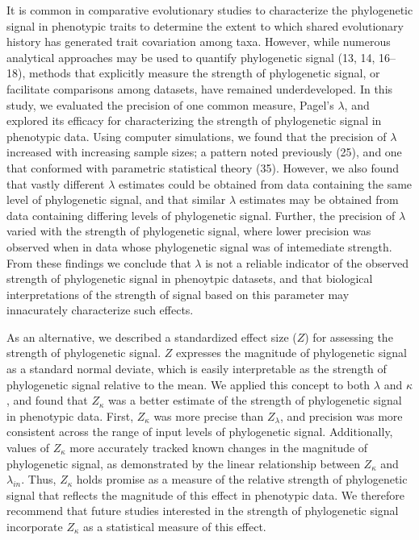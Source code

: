 \documentclass[9pt,twocolumn,twoside,lineno]{pnas-new}
\begin{document}
It is common in comparative evolutionary studies to characterize the
phylogenetic signal in phenotypic traits to determine the extent to
which shared evolutionary history has generated trait covariation among
taxa. However, while numerous analytical approaches may be used to
quantify phylogenetic signal (13, 14, 16--18), methods that explicitly
measure the strength of phylogenetic signal, or facilitate comparisons
among datasets, have remained underdeveloped. In this study, we
evaluated the precision of one common measure, Pagel's \(\lambda\), and
explored its efficacy for characterizing the strength of phylogenetic
signal in phenotypic data. Using computer simulations, we found that the
precision of \(\lambda\) increased with increasing sample sizes; a
pattern noted previously (25), and one that conformed with parametric
statistical theory (35). However, we also found that vastly different
\(\lambda\) estimates could be obtained from data containing the same
level of phylogenetic signal, and that similar \(\lambda\) estimates may
be obtained from data containing differing levels of phylogenetic
signal. Further, the precision of \(\lambda\) varied with the strength
of phylogenetic signal, where lower precision was observed when in data
whose phylogenetic signal was of intemediate strength. From these
findings we conclude that \(\lambda\) is not a reliable indicator of the
observed strength of phylogenetic signal in phenoytpic datasets, and
that biological interpretations of the strength of signal based on this
parameter may innacurately characterize such effects.

As an alternative, we described a standardized effect size (\(Z\)) for
assessing the strength of phylogenetic signal. \(Z\) expresses the
magnitude of phylogenetic signal as a standard normal deviate, which is
easily interpretable as the strength of phylogenetic signal relative to
the mean. We applied this concept to both \(\lambda\) and \(\kappa\),
and found that \(Z_\kappa\) was a better estimate of the strength of
phylogenetic signal in phenotypic data. First, \(Z_\kappa\) was more
precise than \(Z_\lambda\), and precision was more consistent across the
range of input levels of phylogenetic signal. Additionally, values of
\(Z_\kappa\) more accurately tracked known changes in the magnitude of
phylogenetic signal, as demonstrated by the linear relationship between
\(Z_\kappa\) and \(\lambda_{in}\). Thus, \(Z_\kappa\) holds promise as a
measure of the relative strength of phylogenetic signal that reflects
the magnitude of this effect in phenotypic data. We therefore recommend
that future studies interested in the strength of phylogenetic signal
incorporate \(Z_\kappa\) as a statistical measure of this effect.
\end{document}
